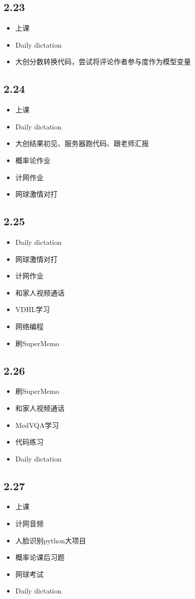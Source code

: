 \documentclass[UTF8]{ctexart}
\begin{document}
\subsection*{2.23}
\begin{itemize}
    \item 上课
    \item Daily dictation
    \item 大创分数转换代码，尝试将评论作者参与度作为模型变量
\end{itemize}
\subsection*{2.24}
\begin{itemize}
    \item 上课
    \item Daily dictation
    \item 大创结果初见、服务器跑代码、跟老师汇报
    \item 概率论作业
    \item 计网作业
    \item 网球激情对打
\end{itemize}
\subsection*{2.25}
\begin{itemize}
    \item Daily dictation
    \item 网球激情对打
    \item 计网作业
    \item 和家人视频通话
    \item VDHL学习
    \item 网络编程
    \item 刷SuperMemo
\end{itemize}
\subsection*{2.26}
\begin{itemize}
    \item 刷SuperMemo
    \item 和家人视频通话
    \item MedVQA学习
    \item 代码练习
    \item Daily dictation
\end{itemize}
\subsection*{2.27}
\begin{itemize}
    \item 上课
    \item 计网音频
    \item 人脸识别python大项目
    \item 概率论课后习题
    \item 网球考试
    \item Daily dictation
\end{itemize}
\end{document}
